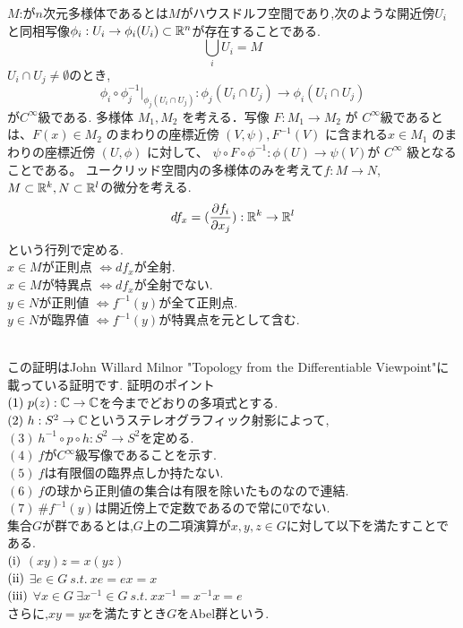 $M$:が$n$次元多様体であるとは$M$がハウスドルフ空間であり,次のような開近傍$U_i$と同相写像$\phi_i : U_i \to \phi_i(U_i) \subset \mathbb R^n$が存在することである.\\
\[ \bigcup_i U_i = M \]
$U_i \cap U_j \neq \emptyset$のとき,
\[
\phi_i \circ \phi_j^{-1} | _{\phi_j(U_i\cap U_j)} :\phi_j(U_i\cap U_j) \to \phi_i(U_i\cap U_j)
\]
が$C^\infty$級である.
{}
多様体 $M_1, M_2$ を考える．写像 $F : M_1 \to M_2$ が $C^\infty$級であるとは、$F(x) \in M_2$ のまわりの座標近傍 $(V,\psi), F^{-1}(V)$ に含まれる$x\in M_1$ のまわりの座標近傍 $(U, \phi)$ に対して、
$\psi \circ F \circ \phi^{-1} : \phi(U) \to \psi(V )$が $C^\infty$ 級となることである。
ユークリッド空間内の多様体のみを考えて$f:M\to N$,$M\subset\mathbb R^k,N\subset\mathbb R^l$の微分を考える.\\
\[
df_x = (\frac{\partial f_i}{\partial x_j}):\mathbb R^k\to\mathbb R^l
\]
という行列で定める.\\
$x\in M$が正則点 $\iff df_x$が全射.\\
$x\in M$が特異点 $\iff df_x$が全射でない.\\
$y\in N$が正則値 $\iff f^{-1}(y)$が全て正則点.\\
$y\in N$が臨界値 $\iff f^{-1}(y)$が特異点を元として含む.\\

\proof[多様体論を用いた代数学の基本定理の証明]
\leavevmode\\
この証明はJohn Willard Milnor "Topology from the Differentiable Viewpoint"に載っている証明です.
証明のポイント\\
$(1)\ p(z):\C\to\C$を今までどおりの多項式とする.\\
$(2)\ h:S^2\to\C$というステレオグラフィック射影によって,\\
$(3)\ h^{-1}\circ p \circ h : S^2 \to S^2$を定める.\\
$(4)\ f$が$C^\infty$級写像であることを示す.\\
$(5)\ f$は有限個の臨界点しか持たない.\\
$(6)\ f$の球から正則値の集合は有限を除いたものなので連結.\\
$(7)\ \# f^{-1}(y)$は開近傍上で定数であるので常に0でない.\\
\proofx
{}
集合$G$が群であるとは,$G$上の二項演算が$x,y,z\in G$に対して以下を満たすことである.\\
$\rm (i)$ $(xy)z=x(yz)$\\
$\rm (ii)$ $\exists e \in  G \ s.t. \ xe=ex=x$\\
$\rm (iii)$ $\forall x\in G \ \exists x^{-1} \in G \ s.t. \ x x^{-1} = x^{-1} x= e$\\
さらに,$xy=yx$を満たすとき$G$をAbel群という.\\

